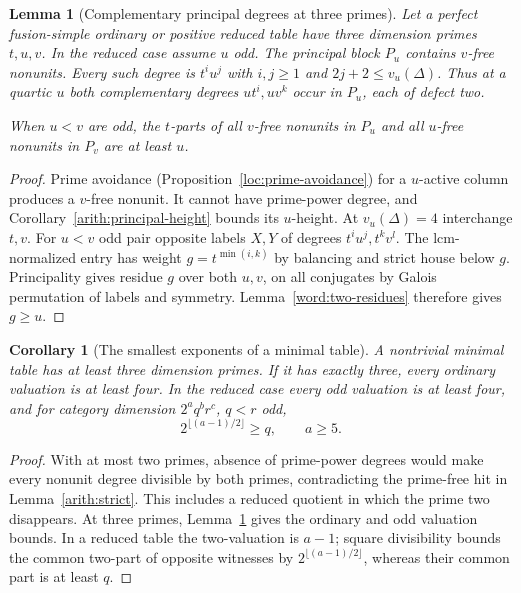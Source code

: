 \documentclass[11pt,a4paper]{article}
\numberwithin{equation}{section}
\newtheorem{lemma}[theorem]{Lemma}
\newtheorem{corollary}[theorem]{Corollary}
\begin{document}
\begin{lemma}[Complementary principal degrees at three primes]\label{red:complementary-degrees}
Let a perfect fusion-simple ordinary or positive reduced table have
three dimension primes $t,u,v$. In the reduced case assume $u$ odd.
The principal block $P_u$ contains $v$-free nonunits. Every such
degree is $t^iu^j$ with $i,j\ge1$ and
$2j+2\le v_u(\Delta)$. Thus at a quartic $u$ both complementary
degrees $ut^i,uv^k$ occur in $P_u$, each of defect two.

When $u<v$ are odd, the $t$-parts of all $v$-free nonunits in $P_u$
and all $u$-free nonunits in $P_v$ are at least $u$.
\end{lemma}
\begin{proof}
Prime avoidance (Proposition~\ref{loc:prime-avoidance}) for a
$u$-active column produces a $v$-free nonunit. It cannot have
prime-power degree, and Corollary~\ref{arith:principal-height}
bounds its $u$-height. At $v_u(\Delta)=4$ interchange $t,v$.
For $u<v$ odd pair opposite labels $X,Y$ of degrees
$t^iu^j,t^kv^l$. The lcm-normalized entry has weight
$g=t^{\min(i,k)}$ by balancing and strict house below $g$.
Principality gives residue $g$ over both $u,v$, on all conjugates
by Galois permutation of labels and symmetry. Lemma~\ref{word:two-residues}
therefore gives $g\ge u$.
\end{proof}

\begin{corollary}[The smallest exponents of a minimal table]
\label{red:small-exponents}\label{red:reduced-height}
A nontrivial minimal table has at least three dimension primes.
If it has exactly three, every ordinary valuation is at least four.
In the reduced case every odd valuation is at least four, and for
category dimension $2^aq^br^c$, $q<r$ odd,
\[
                    2^{\lfloor(a-1)/2\rfloor}\ge q,
                    \qquad a\ge5.
\]
\end{corollary}
\begin{proof}
With at most two primes, absence of prime-power degrees would make
every nonunit degree divisible by both primes, contradicting the
prime-free hit in Lemma~\ref{arith:strict}. This includes a reduced
quotient in which the prime two disappears. At three primes,
Lemma~\ref{red:complementary-degrees} gives the ordinary and odd
valuation bounds. In a reduced table the two-valuation is $a-1$;
square divisibility bounds the common two-part of opposite witnesses
by $2^{\lfloor(a-1)/2\rfloor}$, whereas their common part is at
least $q$.
\end{proof}
\end{document}
